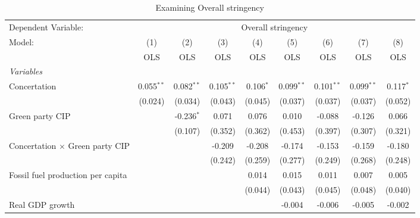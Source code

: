 
\begin{table}[htbp]
   \caption{Examining Overall stringency}
   \centering
   \begin{tabular}{lcccccccc}
      \toprule
      Dependent Variable: & \multicolumn{8}{c}{Overall stringency}\\
      Model:                                  & (1)          & (2)          & (3)          & (4)         & (5)          & (6)          & (7)          & (8)\\  
                                              &  OLS         & OLS          & OLS          & OLS         & OLS          & OLS          & OLS          & OLS\\  
      \midrule
      \emph{Variables}\\
      Concertation                            & 0.055$^{**}$ & 0.082$^{**}$ & 0.105$^{**}$ & 0.106$^{*}$ & 0.099$^{**}$ & 0.101$^{**}$ & 0.099$^{**}$ & 0.117$^{*}$\\   
                                              & (0.024)      & (0.034)      & (0.043)      & (0.045)     & (0.037)      & (0.037)      & (0.037)      & (0.052)\\   
      Green party CIP                         &              & -0.236$^{*}$ & 0.071        & 0.076       & 0.010        & -0.088       & -0.126       & 0.066\\   
                                              &              & (0.107)      & (0.352)      & (0.362)     & (0.453)      & (0.397)      & (0.307)      & (0.321)\\   
      Concertation $\times$ Green party CIP   &              &              & -0.209       & -0.208      & -0.174       & -0.153       & -0.159       & -0.180\\   
                                              &              &              & (0.242)      & (0.259)     & (0.277)      & (0.249)      & (0.268)      & (0.248)\\   
      Fossil fuel production per capita       &              &              &              & 0.014       & 0.015        & 0.011        & 0.007        & 0.005\\   
                                              &              &              &              & (0.044)     & (0.043)      & (0.045)      & (0.048)      & (0.040)\\   
      Real GDP growth                         &              &              &              &             & -0.004       & -0.006       & -0.005       & -0.002\\   

\end{tabular}
\end{table}
